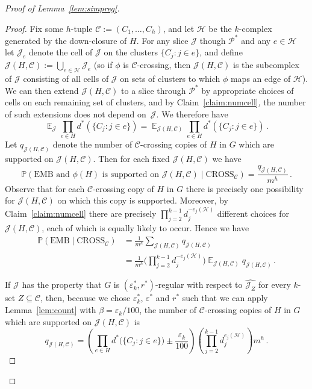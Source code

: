 \documentclass[12pt,a4paper]{amsart}
\let\eps\varepsilon
\newcommand{\oldqed}{}
\def\endofClaim{\hfill\scalebox{.6}{$\Box$}}
\newenvironment{claimproof}[1][Proof]{
  \renewcommand{\oldqed}{\qedsymbol}
  \renewcommand{\qedsymbol}{\endofClaim}
  \begin{proof}[#1]
}{
  \end{proof}
  \renewcommand{\qedsymbol}{\oldqed}
}
\newcommand{\Prob}{\mathbb{P}}
\newcommand{\Exp}{\mathop{\mathbb{E}}}
\newcommand{\Hy}{\mathcal{H}}
\newcommand{\cJ}{\mathcal{J}}
\newcommand{\Part}{\mathcal{P}}
\newcommand{\reld}{d^*}
\newcommand{\HOM}{\text{EMB}}
\newcommand{\CROSS}{\mathrm{CROSS}}
\begin{document}
\begin{proof}[Proof of Lemma~\ref{lem:simpreg}]
\begin{claimproof}
Fix some $h$-tuple $\mathcal{C} := (C_1, \dots, C_h)$, and let $\Hy$ be the $k$-complex generated by the down-closure of $H$. For any slice $\cJ$ though $\Part^*$ and any $e \in \Hy$ let $\cJ_e$ denote the cell of $\cJ$ on the clusters $\{C_j \colon j \in e\}$, and define
 $\cJ(H,\mathcal{C}):= \bigcup_{e \in \Hy} \cJ_e$ (so if $\phi$ is $\mathcal{C}$-crossing, then $\cJ(H, \mathcal{C})$ is the subcomplex of $\cJ$ consisting of all cells of $\cJ$ on sets of clusters to which $\phi$ maps an edge of $\Hy$). We can then extend $\cJ(H, \mathcal{C})$ to a slice through $\Part^*$ by appropriate choices of cells on each remaining set of clusters, and by Claim~\ref{claim:numcell}, the number of such extensions does not depend on~$\cJ$. We therefore have
 \begin{equation}\label{eq:expect:exc} 
\Exp_\cJ
 \prod_{e \in H} \reld(\{C_j : j \in e\})=\Exp_{\cJ(H,\mathcal{C})}
 \prod_{e \in H} \reld(\{C_j : j \in e\})\,.
 \end{equation}
 Let $q_{\cJ(H,\mathcal{C})}$ denote the number of $\mathcal{C}$-crossing copies of $H$ in $G$ which are supported on
 $\cJ(H,\mathcal{C})$. 
Then for each fixed $\cJ(H,\mathcal{C})$ we have
 \[\Prob(\HOM\text{ and } \phi(H)\text{ is supported on }\cJ(H,\mathcal{C})\mid \CROSS_\mathcal{C})=\frac{q_{\cJ(H,\mathcal{C})}}{m^h}\,.\]
Observe that for each $\mathcal{C}$-crossing copy of $H$ in $G$ there is precisely one possibility for $\cJ(H,\mathcal{C})$ on which this copy is supported. Moreover, by Claim~\ref{claim:numcell} there are precisely $\prod_{j=2}^{k-1}d_j^{-e_j(\Hy)}$ different choices for $\cJ(H,\mathcal{C})$, each of which is equally likely to occur. Hence we have 
 \begin{equation}\begin{split}\label{eq:expect:hcc}
  \Prob(\HOM \mid \CROSS_\mathcal{C})&=\frac{1}{m^h}\sum_{\cJ(H,\mathcal{C})}q_{\cJ(H,\mathcal{C})}\\
  &=\frac{1}{m^h}\Big(\prod_{j=2}^{k-1}d_j^{-e_j(\Hy)}\Big)\Exp_{\cJ(H,\mathcal{C})}q_{\cJ(H,\mathcal{C})} \,.
 \end{split}\end{equation}

If $\cJ$ has the property that $G$ is $(\eps_k^*, r^*)$-regular with respect to
$\hat{\cJ_Z}$ for every $k$-set $Z \subseteq \mathcal{C}$, then, because we chose $\eps^*_k$, $\eps^*$ and $r^*$ such that we can apply Lemma~\ref{lem:count} with $\beta=\eps_k/100$, the number of $\mathcal{C}$-crossing copies of $H$ in $G$ which are supported on $\cJ(H,\mathcal{C})$ is
\[ q_{\cJ(H,\mathcal{C})}=\left(\prod_{e\in H} \reld\big(\{C_j:j\in e\} \big) \pm
\frac{\eps_k}{100} \right) \left(\prod_{j=2}^{k-1}d_j^{e_j(\mathcal{H})}\right)
m^{h}\,.\]


\end{claimproof}
\end{proof}
\end{document}
